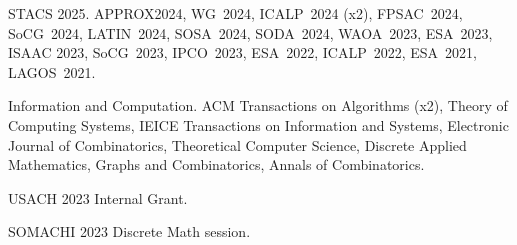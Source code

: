 

STACS 2025. APPROX2024, WG~2024, ICALP~2024 (x2), FPSAC~2024, SoCG~2024, LATIN~2024, SOSA~2024, SODA~2024, WAOA~2023, ESA~2023, ISAAC 2023, SoCG~2023, IPCO~2023, ESA~2022, ICALP~2022, ESA~2021, LAGOS~2021. 


Information and Computation.
ACM Transactions on Algorithms (x2), Theory of Computing Systems, IEICE Transactions on Information and Systems, Electronic Journal of Combinatorics, Theoretical Computer Science, Discrete Applied Mathematics, Graphs and Combinatorics, Annals of Combinatorics.


USACH 2023 Internal Grant.


SOMACHI 2023 Discrete Math session.


 
